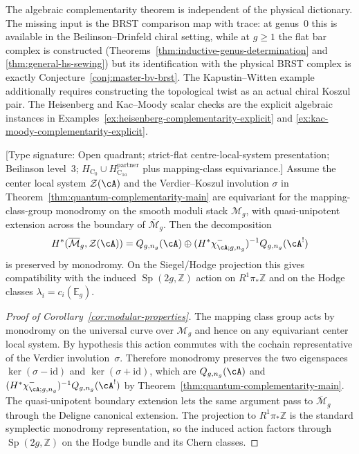 \begin{remark}
The algebraic complementarity theorem is independent of the physical
dictionary. The missing input is the BRST comparison map with trace:
at genus~$0$ this is available in the Beilinson--Drinfeld chiral
setting, while at $g\geq1$ the flat bar complex is constructed
(Theorems~\ref{thm:inductive-genus-determination} and
\ref{thm:general-hs-sewing}) but its identification with the physical
BRST complex is exactly Conjecture~\ref{conj:master-bv-brst}. The
Kapustin--Witten example additionally requires constructing the
topological twist as an actual chiral Koszul pair. The Heisenberg and
Kac--Moody scalar checks are the explicit algebraic instances in
Examples~\ref{ex:heisenberg-complementarity-explicit} and
\ref{ex:kac-moody-complementarity-explicit}.
\end{remark}

\begin{corollary}
\label{cor:modular-properties}
\textup{[Type signature: Open quadrant; strict-flat
centre-local-system presentation; Beilinson level~3;
\(H_{\mathrm C_0}\cup H_{\mathrm C_{1a}}^{\mathrm{partner}}\)
plus mapping-class equivariance.]}
Assume the center local system $\mathcal Z(\cA)$ and the
Verdier--Koszul involution $\sigma$ in
Theorem~\ref{thm:quantum-complementarity-main} are equivariant for the
mapping-class-group monodromy on the smooth moduli stack
$\mathcal M_g$, with quasi-unipotent extension across the boundary of
$\overline{\mathcal M}_g$. Then the decomposition
\[
H^*(\overline{\mathcal M}_g,\mathcal Z(\cA))
=Q_{g,n_g}(\cA)\oplus
(H^*\chi^-_{\cA;g,n_g})^{-1}Q_{g,n_g}(\cA^!)
\]
is preserved by monodromy. On the Siegel/Hodge projection this gives
compatibility with the induced $\operatorname{Sp}(2g,\mathbb Z)$
action on $R^1\pi_*\mathbb Z$ and on the Hodge classes
$\lambda_i=c_i(\mathbb E_g)$.
\end{corollary}

\begin{proof}[Proof of Corollary~\ref{cor:modular-properties}]
The mapping class group acts by monodromy on the universal curve over
$\mathcal M_g$ and hence on any equivariant center local system. By
hypothesis this action commutes with the cochain representative of
the Verdier involution~$\sigma$. Therefore monodromy preserves the
two eigenspaces $\ker(\sigma-\mathrm{id})$ and
$\ker(\sigma+\mathrm{id})$, which are
$Q_{g,n_g}(\cA)$ and
$(H^*\chi^-_{\cA;g,n_g})^{-1}Q_{g,n_g}(\cA^!)$ by
Theorem~\ref{thm:quantum-complementarity-main}. The quasi-unipotent
boundary extension lets the same argument pass to
$\overline{\mathcal M}_g$ through the Deligne canonical extension.
The projection to $R^1\pi_*\mathbb Z$ is the standard symplectic
monodromy representation, so the induced action factors through
$\operatorname{Sp}(2g,\mathbb Z)$ on the Hodge bundle and its Chern
classes.
\end{proof}

